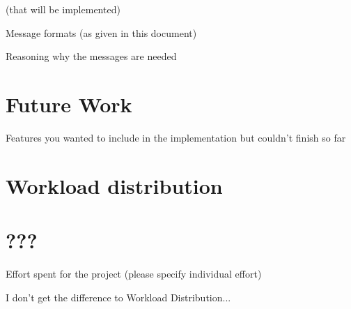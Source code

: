 \documentclass[a4paper,english,10pt,NET]{tumarticle}
\begin{document}
(that will be implemented)

Message formats (as given in this document)

Reasoning why the messages are needed

\section{Future Work}

Features you wanted to include in the implementation but couldn’t finish so far


\section{Workload distribution}


\section{???}

Effort spent for the project (please specify individual effort)

I don't get the difference to Workload Distribution...



\todos
\end{document}
